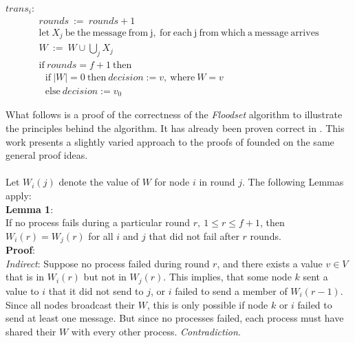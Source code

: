 \documentclass[fleqn]{article}
\begin{document}
\begin{mdframed}[nobreak=true, backgroundcolor=light-gray, roundcorner=10pt,leftmargin=1, rightmargin=1, innerleftmargin=15, innertopmargin=15,innerbottommargin=15, outerlinewidth=1, linecolor=light-gray]
\noindent $trans_i$:
\begin{gather*}
  rounds\ :=\ rounds+1\\
  \mathrm{let}\ X_j\ \mathrm{be\ the\ message\ from\ j,\ for\ each\ j\ from\ which\ a\ message\ arrives}\\
  W\ :=\ W \cup \bigcup_{j} X_j\\
  \mathrm{if}\ rounds = f+1\ \mathrm{then}\\
  \ \ \   \mathrm{if}\ |W| = 0\ \mathrm{then}\ decision := v,\ \mathrm{where}\ W = {v}\\
  \ \ \   \mathrm{else}\ decision := v_0
\end{gather*}
\end{mdframed}

\noindent What follows is a proof of the correctness of the \textit{Floodset} algorithm to illustrate the principles behind the algorithm. It has already been proven correct in \cite{refNancy}. This work presents a slightly varied approach to the proofs of \cite{refNancy} founded on the same general proof ideas.\\
\\
\noindent Let $W_i(j)$ denote the value of $W$ for node $i$ in round $j$. The following Lemmas apply:\\

\noindent \textbf{Lemma 1}:\\
If no process fails during a particular round $r,\ 1 \le r \le f + 1$, then $W_i(r) = W_j(r)$ for all $i$ and $j$ that did not fail after $r$ rounds.\\
\textbf{Proof}:\\
\textit{Indirect}: Suppose no process failed during round $r$, and there exists a value $v \in V$ that is in $W_i(r)$ but not in $W_j(r)$. This implies, that some node $k$ sent a value to $i$ that it did not send to $j$, or $i$ failed to send a member of $W_i(r-1)$. Since all nodes broadcast their $W$, this is only possible if node $k$ or $i$ failed to send at least one message. But since no processes failed, each process must have shared their $W$ with every other process. \textit{Contradiction}. \\
\end{document}
